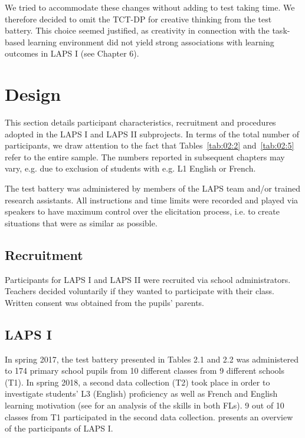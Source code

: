 \documentclass[output=paper]{langsci/langscibook}
\begin{document}
We tried to accommodate these changes without adding to test taking time. We therefore decided to omit the TCT-DP for creative thinking from the test battery. This choice seemed justified, as creativity in connection with the task-based learning environment did not yield strong associations with learning outcomes in LAPS I (see Chapter 6). 

\section{Design}

This section details participant characteristics, recruitment and procedures adopted in the LAPS I and LAPS II subprojects. In terms of the total number of participants, we draw attention to the fact that Tables~\ref{tab:02:2} and~\ref{tab:02:5} refer to the entire sample. The numbers reported in subsequent chapters may vary, e.g. due to exclusion of students with e.g. L1 English or French. 

The test battery was administered by members of the LAPS team and/or trained research assistants. All instructions and time limits were recorded and played via speakers to have maximum control over the elicitation process, i.e. to create situations that were as similar as possible. 

 \subsection{Recruitment}


Participants for LAPS I and LAPS II were recruited via school administrators. Teachers decided voluntarily if they wanted to participate with their class. Written consent was obtained from the pupils’ parents. 

 \subsection{LAPS I}


In spring 2017, the test battery presented in Tables 2.1 and 2.2 was administered to 174 primary school pupils from 10 different classes from 9 different schools (T1). In spring 2018, a second data collection (T2) took place in order to investigate students’ L3 (English) proficiency as well as French and English learning motivation (see \citealt{BertheleUdry2019} for an analysis of the skills in both FLs). 9 out of 10 classes from T1 participated in the second data collection.  presents an overview of the participants of LAPS I.
\end{document}
